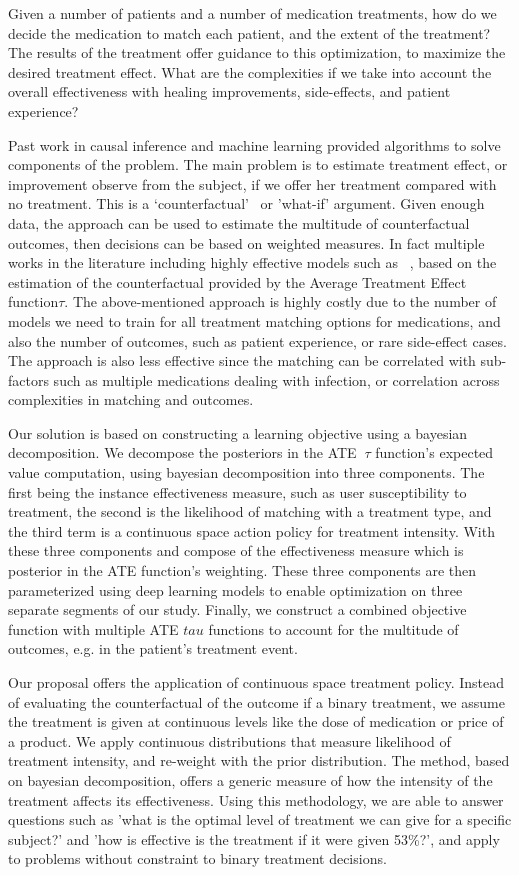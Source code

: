 \documentclass{article}
\begin{document}
Given a number of patients and a number of medication treatments, how do we decide the medication to match each patient, and the extent of the treatment? The results of the treatment offer guidance to this optimization, to maximize the desired treatment effect. What are the complexities if we take into account the overall effectiveness with healing improvements, side-effects, and patient experience? 

Past work in causal inference and machine learning provided algorithms to solve components of the problem. The main problem is to estimate treatment effect, or improvement observe from the subject, if we offer her treatment compared with no treatment. This is a `counterfactual'~\cite{pearl} or 'what-if' argument. Given enough data, the approach can be used to estimate the multitude of counterfactual outcomes, then decisions can be based on weighted measures. In fact multiple works in the literature including highly effective models such as ~\cite{rlearner}, based on the estimation of the counterfactual provided by the Average Treatment Effect function$\tau$. The above-mentioned approach is highly costly due to the number of models we need to train for all treatment matching options for medications, and also the number of outcomes, such as patient experience, or rare side-effect cases. The approach is also less effective since the matching can be correlated with sub-factors such as multiple medications dealing with infection, or correlation across complexities in matching and outcomes. 

Our solution is based on constructing a learning objective using a bayesian decomposition. We decompose the posteriors in the ATE $~\tau$ function's expected value computation, using bayesian decomposition into three components. The first being the instance effectiveness measure, such as user susceptibility to treatment, the second is the likelihood of matching with a treatment type, and the third term is a continuous space action policy for treatment intensity. With these three components and compose of the effectiveness measure which is posterior in the ATE function's weighting. These three components are then parameterized using deep learning models to enable optimization on three separate segments of our study. Finally, we construct a combined objective function with multiple ATE $tau$ functions to account for the multitude of outcomes, e.g. in the patient's treatment event. 

Our proposal offers the application of continuous space treatment policy. Instead of evaluating the counterfactual of the outcome if a binary treatment, we assume the treatment is given at continuous levels like the dose of medication or price of a product. We apply continuous distributions that measure likelihood of treatment intensity, and re-weight with the prior distribution. The method, based on bayesian decomposition, offers a generic measure of how the intensity of the treatment affects its effectiveness. Using this methodology, we are able to answer questions such as 'what is the optimal level of treatment we can give for a specific subject?' and 'how is effective is the treatment if it were given 53\%?', and apply to problems without constraint to binary treatment decisions. 
\end{document}
